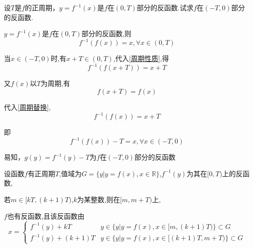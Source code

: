 \begin{example}\label{exer:周期例题}
    设$T$是$f$的正周期，$y=f^{-1}(x)$是$f$在$(0,T)$部分的反函数.试求$f$在$(-T,0)$部分的反函数.
\end{example}

\begin{solution}   \label{周期证明}

    $y=f^{-1}(x)$是$f$在$(0,T)$部分的反函数,则
    \begin{equation}
        f^{-1}(f(x))=x,\forall x \in (0,T) \label{周期性质}
    \end{equation}

    当$x \in (-T,0)$时,有$x+T\in (0,T)$,代入\cref{周期性质},得
    \begin{equation}
        f^{-1}(f(x+T))=x+T  \label{周期替换}
    \end{equation}

    又$f(x)$以$T$为周期,有
    \begin{equation}
        f(x+T)=f(x)
    \end{equation}

    代入\cref{周期替换},
    \begin{equation*}
        f^{-1}(f(x))=x+T
    \end{equation*}

    即
    \begin{equation*}
        f^{-1}(f(x))-T=x,\forall x \in (-T,0)
    \end{equation*}

    易知，$g(y)=f^{-1}(y)-T$为$f$在$(-T,0)$部分的反函数

\end{solution}

\begin{theorem}[反函数周期偏移]
    设函数$f$有正周期$T$,值域为$G=\{y|y=f(x),x \in \mathbb{R}\}$,$f^{-1}(y)$为其在$[0,T)$上的反函数,

    若$m\in [kT,(k+1)T)$,$k$为某整数,则在$[m,m+T)$上,

    $f$也有反函数,且该反函数由
    \begin{equation}
        x = \begin{cases}
            f^{-1}(y)+kT     & y\in \{y|y=f(x),x\in [m,(k+1)T)\}\subset G   \\
            f^{-1}(y)+(k+1)T & y\in \{y|y=f(x),x\in [(k+1)T,m+T)\}\subset G
        \end{cases}
    \end{equation}
\end{theorem}

